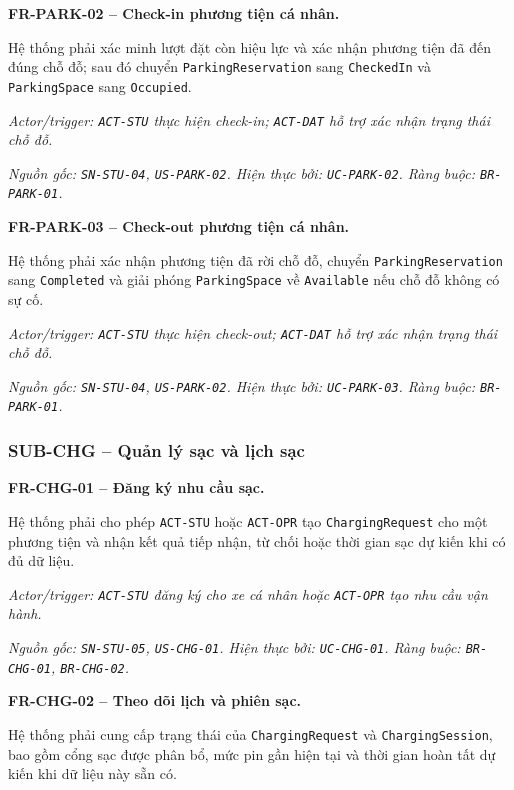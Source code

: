 \medskip
\noindent\textbf{FR-PARK-02 -- Check-in phương tiện cá nhân.}\par
\nopagebreak[4]
Hệ thống phải xác minh lượt đặt còn hiệu lực và xác nhận phương tiện đã đến đúng chỗ đỗ; sau đó chuyển \texttt{ParkingReservation} sang \texttt{CheckedIn} và \texttt{ParkingSpace} sang \texttt{Occupied}.

\textit{Actor/trigger: \texttt{ACT-STU} thực hiện check-in; \texttt{ACT-DAT} hỗ trợ xác nhận trạng thái chỗ đỗ.}\par
\textit{Nguồn gốc: \texttt{SN-STU-04}, \texttt{US-PARK-02}. Hiện thực bởi: \texttt{UC-PARK-02}. Ràng buộc: \texttt{BR-PARK-01}.}

\medskip
\noindent\textbf{FR-PARK-03 -- Check-out phương tiện cá nhân.}\par
\nopagebreak[4]
Hệ thống phải xác nhận phương tiện đã rời chỗ đỗ, chuyển \texttt{ParkingReservation} sang \texttt{Completed} và giải phóng \texttt{ParkingSpace} về \texttt{Available} nếu chỗ đỗ không có sự cố.

\textit{Actor/trigger: \texttt{ACT-STU} thực hiện check-out; \texttt{ACT-DAT} hỗ trợ xác nhận trạng thái chỗ đỗ.}\par
\textit{Nguồn gốc: \texttt{SN-STU-04}, \texttt{US-PARK-02}. Hiện thực bởi: \texttt{UC-PARK-03}. Ràng buộc: \texttt{BR-PARK-01}.}

\subsubsection{SUB-CHG -- Quản lý sạc và lịch sạc}

\noindent\textbf{FR-CHG-01 -- Đăng ký nhu cầu sạc.}\par
\nopagebreak[4]
Hệ thống phải cho phép \texttt{ACT-STU} hoặc \texttt{ACT-OPR} tạo \texttt{ChargingRequest} cho một phương tiện và nhận kết quả tiếp nhận, từ chối hoặc thời gian sạc dự kiến khi có đủ dữ liệu.

\textit{Actor/trigger: \texttt{ACT-STU} đăng ký cho xe cá nhân hoặc \texttt{ACT-OPR} tạo nhu cầu vận hành.}\par
\textit{Nguồn gốc: \texttt{SN-STU-05}, \texttt{US-CHG-01}. Hiện thực bởi: \texttt{UC-CHG-01}. Ràng buộc: \texttt{BR-CHG-01}, \texttt{BR-CHG-02}.}

\medskip
\noindent\textbf{FR-CHG-02 -- Theo dõi lịch và phiên sạc.}\par
\nopagebreak[4]
Hệ thống phải cung cấp trạng thái của \texttt{ChargingRequest} và \texttt{ChargingSession}, bao gồm cổng sạc được phân bổ, mức pin gần hiện tại và thời gian hoàn tất dự kiến khi dữ liệu này sẵn có.


